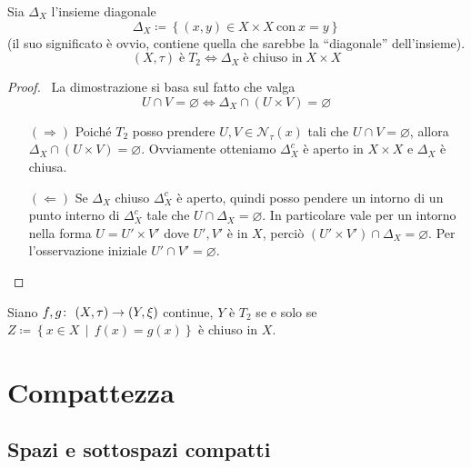\begin{theorem} Sia $\Delta_{X}$ l'insieme diagonale 
	\begin{equation*}
	\Delta_{X} \coloneqq \left\{(x,y)\in X \times X \ \text{con} \ x=y\right\}
	\end{equation*}
	(il suo significato è ovvio, contiene quella che sarebbe la \enquote{diagonale} dell'insieme).
	\begin{equation*}
	(X, \tau) \; \text{è} \; T_2 \Leftrightarrow \Delta_{X} \; \text{è chiuso in} \; X \times X
	\end{equation*}
\end{theorem} 
\begin{proof} \
	La dimostrazione si basa sul fatto che valga 
	\begin{equation*}
	U \cap V = \varnothing \Leftrightarrow \Delta_X \cap (U \times V) = \varnothing
	\end{equation*}
	\begin{enumerate}
		\item[$(\Rightarrow)$] Poiché $T_2$ posso prendere $U, V \in \mathcal{N}_\tau(x)$ tali che $U \cap V = \varnothing$, allora $\Delta_X \cap (U \times V) = \varnothing$. Ovviamente otteniamo $\Delta_X^c$ è aperto in $X\times X$ e $\Delta_X$ è chiusa. 
		\item[$(\Leftarrow)$] Se $\Delta_X$ chiuso $\Delta^c_X$ è aperto, quindi posso pendere un intorno di un punto interno di $\Delta^c_X$ tale che $U \cap \Delta_X = \varnothing$. In particolare vale per un intorno nella forma $U = U' \times V'$ dove $U', V'$ è in $X$, perciò $(U' \times V') \cap \Delta_X = \varnothing$. Per l'osservazione iniziale $U' \cap V' = \varnothing$.
	\end{enumerate}
\end{proof}

\begin{theorem}
	Siano $f,g \colon\ (X,\tau) \rightarrow (Y,\xi)$ continue, $Y$ è $T_2$ se e solo se $Z \coloneqq \left\{x \in X \,\middle|\, f(x) = g(x) \right\}$ è chiuso in $X$.
\end{theorem}



\section{Compattezza}
\subsection{\textcolor{TopGener}{\textbf{Spazi e sottospazi compatti}}}



